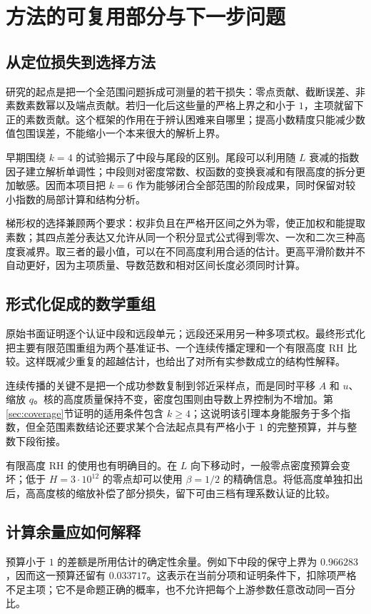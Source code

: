 \section{方法的可复用部分与下一步问题}\label{sec:methods}

\subsection{从定位损失到选择方法}
研究的起点是把一个全范围问题拆成可测量的若干损失：零点贡献、截断误差、非素数素数幂以及端点贡献。若归一化后这些量的严格上界之和小于 $1$，主项就留下正的素数贡献。这个框架的作用在于辨认困难来自哪里；提高小数精度只能减少数值包围误差，不能缩小一个本来很大的解析上界。

早期围绕 $k=4$ 的试验揭示了中段与尾段的区别。尾段可以利用随 $L$ 衰减的指数因子建立解析单调性；中段则对密度常数、权函数的变换衰减和有限高度的拆分更加敏感。因而本项目把 $k=6$ 作为能够闭合全部范围的阶段成果，同时保留对较小指数的局部计算和结构分析。

梯形权的选择兼顾两个要求：权非负且在严格开区间之外为零，使正加权和能提取素数；其四点差分表达又允许从同一个积分显式公式得到零次、一次和二次三种高度衰减界。取三者的最小值，可以在不同高度利用合适的估计。更高平滑阶数并不自动更好，因为主项质量、导数范数和相对区间长度必须同时计算。

\subsection{形式化促成的数学重组}
原始书面证明逐个认证中段和远段单元；远段还采用另一种多项式权。最终形式化把主要有限范围重组为两个基准证书、一个连续传播定理和一个有限高度 RH 比较。这样既减少重复的超越估计，也给出了对所有实参数成立的结构性解释。

连续传播的关键不是把一个成功参数复制到邻近采样点，而是同时平移 $A$ 和 $u$、缩放 $q$。核的高度质量保持不变，密度包围则由导数上界控制为不增加。第\ref{sec:coverage}节证明的适用条件包含 $k\ge4$；这说明该引理本身能服务于多个指数，但全范围素数结论还要求某个合法起点具有严格小于 $1$ 的完整预算，并与整数下段衔接。

有限高度 RH 的使用也有明确目的。在 $L$ 向下移动时，一般零点密度预算会变坏；低于 $H=3\cdot10^{12}$ 的零点却可以使用 $\beta=1/2$ 的精确信息。将低高度单独扣出后，高高度核的缩放补偿了部分损失，留下可由三档有理系数认证的比较。

\subsection{计算余量应如何解释}
预算小于 $1$ 的差额是所用估计的确定性余量。例如下中段的保守上界为 $0.966283$，因而这一预算还留有 $0.033717$。这表示在当前分项和证明条件下，扣除项严格不足主项；它不是命题正确的概率，也不允许把每个上游参数任意改动同一百分比。

